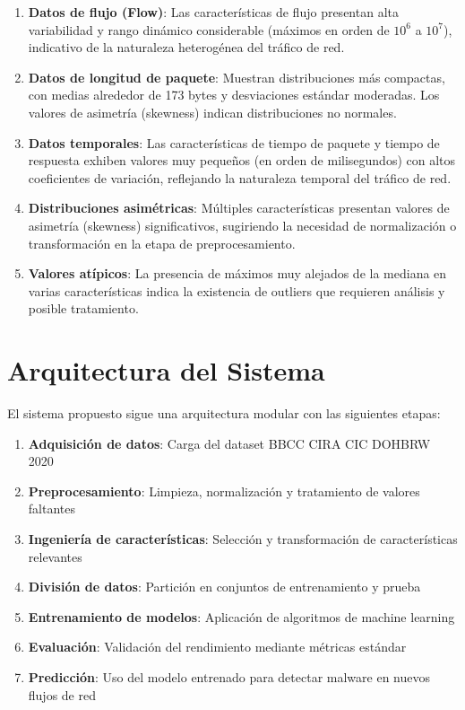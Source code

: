 \begin{enumerate}
    \item \textbf{Datos de flujo (Flow)}: Las características de flujo presentan alta variabilidad y rango dinámico considerable (máximos en orden de $10^6$ a $10^7$), indicativo de la naturaleza heterogénea del tráfico de red.
    
    \item \textbf{Datos de longitud de paquete}: Muestran distribuciones más compactas, con medias alrededor de 173 bytes y desviaciones estándar moderadas. Los valores de asimetría (skewness) indican distribuciones no normales.
    
    \item \textbf{Datos temporales}: Las características de tiempo de paquete y tiempo de respuesta exhiben valores muy pequeños (en orden de milisegundos) con altos coeficientes de variación, reflejando la naturaleza temporal del tráfico de red.
    
    \item \textbf{Distribuciones asimétricas}: Múltiples características presentan valores de asimetría (skewness) significativos, sugiriendo la necesidad de normalización o transformación en la etapa de preprocesamiento.
    
    \item \textbf{Valores atípicos}: La presencia de máximos muy alejados de la mediana en varias características indica la existencia de outliers que requieren análisis y posible tratamiento.
\end{enumerate}

\section{Arquitectura del Sistema}\label{sec:arquitectura}

El sistema propuesto sigue una arquitectura modular con las siguientes etapas:

\begin{enumerate}
    \item \textbf{Adquisición de datos}: Carga del dataset BBCC CIRA CIC DOHBRW 2020
    \item \textbf{Preprocesamiento}: Limpieza, normalización y tratamiento de valores faltantes
    \item \textbf{Ingeniería de características}: Selección y transformación de características relevantes
    \item \textbf{División de datos}: Partición en conjuntos de entrenamiento y prueba
    \item \textbf{Entrenamiento de modelos}: Aplicación de algoritmos de machine learning
    \item \textbf{Evaluación}: Validación del rendimiento mediante métricas estándar
    \item \textbf{Predicción}: Uso del modelo entrenado para detectar malware en nuevos flujos de red
\end{enumerate}

